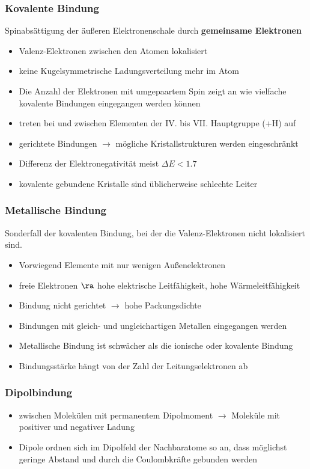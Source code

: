 \documentclass[fs, footer]{latex4ei}
\begin{document}
\begin{multicols*}{4}
{\subsubsection{Kovalente Bindung}
	Spinabsättigung der äußeren Elektronenschale durch \textbf{gemeinsame Elektronen}
  
	\begin{itemize}
    	\item Valenz-Elektronen zwischen den Atomen lokalisiert
		\item keine Kugelsymmetrische Ladungsverteilung mehr im Atom
		\item Die Anzahl der Elektronen mit umgepaartem Spin zeigt an wie vielfache kovalente Bindungen eingegangen werden können
		\item treten bei und zwischen Elementen der IV. bis VII. Hauptgruppe (+H) auf
		\item gerichtete Bindungen $\rightarrow$ mögliche Kristallstrukturen werden eingeschränkt
		\item Differenz der Elektronegativität meist $\Delta E<1.7$
		\item kovalente gebundene Kristalle sind üblicherweise schlechte Leiter 
	\end{itemize}


\subsubsection{Metallische Bindung}
	Sonderfall der kovalenten Bindung, bei der die Valenz-Elektronen nicht lokalisiert sind.
	\begin{itemize}
    	\item Vorwiegend Elemente mit nur wenigen Außenelektronen
		\item freie Elektronen $\ra $ hohe elektrische Leitfähigkeit, hohe Wärmeleitfähigkeit
		\item Bindung nicht gerichtet $\rightarrow$ hohe Packungsdichte 
		\item Bindungen mit gleich- und ungleichartigen Metallen eingegangen werden
		\item Metallische Bindung ist schwächer als die ionische oder kovalente Bindung
		\item Bindungsstärke hängt von der Zahl der Leitungselektronen ab
	\end{itemize}
	
\subsubsection{Dipolbindung}
	\begin{itemize}
		\item zwischen Molekülen mit permanentem Dipolmoment $\rightarrow$ Moleküle mit positiver und negativer Ladung 
		\item Dipole ordnen sich im Dipolfeld der Nachbaratome so an, dass möglichst geringe Abstand und durch die Coulombkräfte gebunden werden 
    \end{itemize}

}
\end{multicols*}
\end{document}

